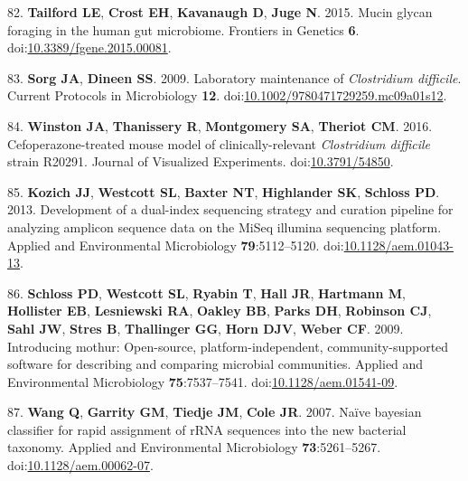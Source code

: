 \documentclass[
  12pt,
]{article}
\newenvironment{cslreferences}%
  {}%
  {\par}
\begin{document}
\begin{cslreferences}
\leavevmode\hypertarget{ref-Tailford2015}{}%
82. \textbf{Tailford LE}, \textbf{Crost EH}, \textbf{Kavanaugh D},
\textbf{Juge N}. 2015. Mucin glycan foraging in the human gut
microbiome. Frontiers in Genetics \textbf{6}.
doi:\href{https://doi.org/10.3389/fgene.2015.00081}{10.3389/fgene.2015.00081}.

\leavevmode\hypertarget{ref-Sorg2009}{}%
83. \textbf{Sorg JA}, \textbf{Dineen SS}. 2009. Laboratory maintenance
of \emph{Clostridium difficile}. Current Protocols in Microbiology
\textbf{12}.
doi:\href{https://doi.org/10.1002/9780471729259.mc09a01s12}{10.1002/9780471729259.mc09a01s12}.

\leavevmode\hypertarget{ref-Winston2016}{}%
84. \textbf{Winston JA}, \textbf{Thanissery R}, \textbf{Montgomery SA},
\textbf{Theriot CM}. 2016. Cefoperazone-treated mouse model of
clinically-relevant \emph{Clostridium difficile} strain R20291. Journal
of Visualized Experiments.
doi:\href{https://doi.org/10.3791/54850}{10.3791/54850}.

\leavevmode\hypertarget{ref-Kozich2013}{}%
85. \textbf{Kozich JJ}, \textbf{Westcott SL}, \textbf{Baxter NT},
\textbf{Highlander SK}, \textbf{Schloss PD}. 2013. Development of a
dual-index sequencing strategy and curation pipeline for analyzing
amplicon sequence data on the MiSeq illumina sequencing platform.
Applied and Environmental Microbiology \textbf{79}:5112--5120.
doi:\href{https://doi.org/10.1128/aem.01043-13}{10.1128/aem.01043-13}.

\leavevmode\hypertarget{ref-Schloss2009}{}%
86. \textbf{Schloss PD}, \textbf{Westcott SL}, \textbf{Ryabin T},
\textbf{Hall JR}, \textbf{Hartmann M}, \textbf{Hollister EB},
\textbf{Lesniewski RA}, \textbf{Oakley BB}, \textbf{Parks DH},
\textbf{Robinson CJ}, \textbf{Sahl JW}, \textbf{Stres B},
\textbf{Thallinger GG}, \textbf{Horn DJV}, \textbf{Weber CF}. 2009.
Introducing mothur: Open-source, platform-independent,
community-supported software for describing and comparing microbial
communities. Applied and Environmental Microbiology
\textbf{75}:7537--7541.
doi:\href{https://doi.org/10.1128/aem.01541-09}{10.1128/aem.01541-09}.

\leavevmode\hypertarget{ref-Wang2007}{}%
87. \textbf{Wang Q}, \textbf{Garrity GM}, \textbf{Tiedje JM},
\textbf{Cole JR}. 2007. Naïve bayesian classifier for rapid assignment
of rRNA sequences into the new bacterial taxonomy. Applied and
Environmental Microbiology \textbf{73}:5261--5267.
doi:\href{https://doi.org/10.1128/aem.00062-07}{10.1128/aem.00062-07}.


\end{cslreferences}
\end{document}
